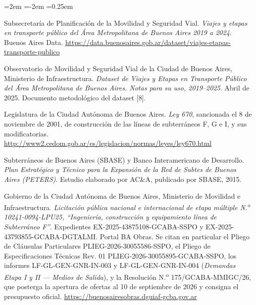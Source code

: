 \documentclass{article}
\begin{document}
\begin{list}{}{\leftmargin=2em \itemindent=-2em \itemsep=0.25em}
\item[] [8] Subsecretaría de Planificación de la Movilidad y Seguridad Vial. \textit{Viajes y etapas en
transporte público del Área Metropolitana de Buenos Aires 2019 a 2024}. Buenos Aires Data.
\url{https://data.buenosaires.gob.ar/dataset/viajes-etapas-transporte-publico}

\item[] [9] Observatorio de Movilidad y Seguridad Vial de la Ciudad de Buenos Aires, Ministerio de
Infraestructura. \textit{Dataset de Viajes y Etapas en Transporte Público del Área Metropolitana de Buenos
Aires. Notas para su uso, 2019--2025}. Abril de 2025. Documento metodológico del dataset [8].

\item[] [10] Legislatura de la Ciudad Autónoma de Buenos Aires. \textit{Ley 670}, sancionada el 8 de
noviembre de 2001, de construcción de las líneas de subterráneos F, G e I, y sus modificatorias.
\url{http://www2.cedom.gob.ar/es/legislacion/normas/leyes/ley670.html}

\item[] [11] Subterráneos de Buenos Aires (SBASE) y Banco Interamericano de Desarrollo. \textit{Plan
Estratégico y Técnico para la Expansión de la Red de Subtes de Buenos Aires (PETERS)}. Estudio elaborado
por AC\&A, publicado por SBASE, 2015.

\item[] [12] Gobierno de la Ciudad Autónoma de Buenos Aires, Ministerio de Movilidad e Infraestructura.
\textit{Licitación pública nacional e internacional de etapa múltiple N.\textsuperscript{o}
10241-0094-LPU25, ``Ingeniería, construcción y equipamiento línea de Subterráneo F''}. Expedientes
EX-2025-43875108-GCABA-SSPO y EX-2025-43793855-GCABA-DGTALMI. Portal BA Obras. Se citan en particular el
Pliego de Cláusulas Particulares PLIEG-2026-30055586-SSPO, el Pliego de Especificaciones Técnicas Rev. 01
PLIEG-2026-30055895-GCABA-SSPO, los informes LF-GL-GEN-GNR-IN-003 y LF-GL-GEN-GNR-IN-004
(\textit{Demandas Etapa I y II --- Medios de Salida}), y la Resolución N.\textsuperscript{o}
175/GCABA-MMIGC/26, que posterga la apertura de ofertas al 10 de septiembre de 2026 y consigna el
presupuesto oficial.
\url{https://buenosairesobras.dguiaf-gcba.gov.ar}


\end{list}
\end{document}

